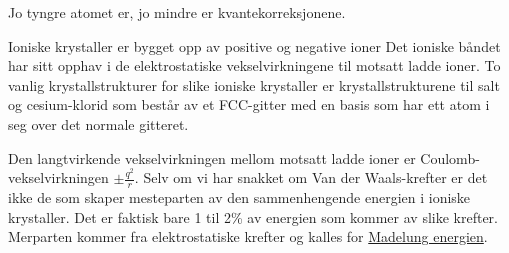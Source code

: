 \documentclass{article}
\begin{document}
Jo tyngre atomet er, jo mindre er kvantekorreksjonene.

Ioniske krystaller er bygget opp av positive og negative ioner Det ioniske båndet har sitt opphav i de elektrostatiske vekselvirkningene til motsatt ladde ioner. To vanlig krystallstrukturer for slike ioniske krystaller er krystallstrukturene til salt og cesium-klorid som består av et FCC-gitter med en basis som har ett atom i seg over det normale gitteret. 

Den langtvirkende vekselvirkningen mellom motsatt ladde ioner er Coulomb-vekselvirkningen $\pm \frac{q^2}{r}$. Selv om vi har snakket om Van der Waals-krefter er det ikke de som skaper mesteparten av den sammenhengende energien i ioniske krystaller. Det er faktisk bare 1 til 2\% av energien som kommer av slike krefter. Merparten kommer fra elektrostatiske krefter og kalles for \underline{Madelung energien}.
\end{document}

